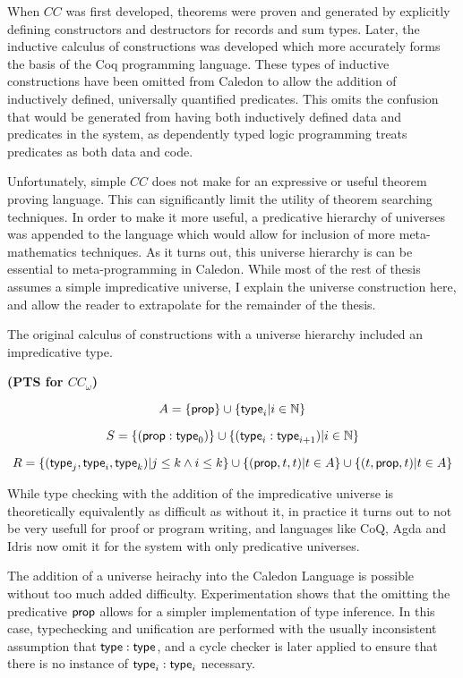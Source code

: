 When $CC$ was first developed, theorems were proven and generated by explicitly defining
constructors and destructors for records and sum types.  Later, the inductive calculus of constructions was developed 
\citep{coquand1990inductively} which more accurately forms the basis of the Coq programming language.  These types of inductive
constructions have been omitted from Caledon to allow the addition of inductively defined, universally quantified predicates.
This omits the confusion that would be generated from having both inductively defined data and predicates in the system, as 
dependently typed logic programming treats predicates as both data and code.

Unfortunately, simple $CC$ does not make for an expressive or useful theorem proving language.  
This can significantly limit the utility of theorem searching techniques.  
In order to make it more useful, a predicative hierarchy of universes 
was appended to the language which would allow for inclusion of more meta-mathematics techniques.
As it turns out, this universe hierarchy is can be essential to meta-programming in Caledon.  
While most of the rest of thesis assumes a simple impredicative universe, I explain the 
universe construction here, and allow the reader to extrapolate for the remainder of the thesis.

The original calculus of constructions with a universe hierarchy included an impredicative type.  

\begin{definition}
\textbf{(PTS for $CC_\omega$)}

\[
A = \{ \mathsf{prop} \} \cup \{ \mathsf{type}_i | i \in \mathbb{N} \}
\]

\[
S =   \{ (\mathsf{prop} : \mathsf{type}_0 ) \}
 \cup \{ (\mathsf{type}_i : \mathsf{type}_{i+1} ) | i \in \mathbb{N} \}
\]

\[ 
R = \{ (\mathsf{type}_j,\mathsf{type}_i,\mathsf{type}_k) | j \leq k \wedge i \leq k \}
\cup \{ (\mathsf{prop},t,t) | t \in A \}
\cup \{ (t,\mathsf{prop},t) | t \in A \}
\]

\label{coc:utypes}
\end{definition}

While type checking with the addition of the impredicative universe is theoretically equivalently as difficult 
as without it, in practice it turns out to not be very usefull for proof or program writing, and 
languages like CoQ, Agda and Idris now omit it for the system with only predicative universes.

The addition of a universe heirachy into the Caledon Language is possible without too much added difficulty. 
Experimentation shows that the omitting the predicative $\mathsf{prop}$ allows for a simpler implementation of type inference.
In this case, typechecking and unification are performed with the usually inconsistent assumption that
$\mathsf{type} : \mathsf{type}$, and a cycle checker is later applied to ensure that there is no instance of 
$\mathsf{type}_i : \mathsf{type}_i$ necessary.  

